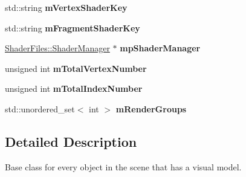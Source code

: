 \begin{DoxyCompactItemize}
\mbox{\label{class_geometry_engine_1_1_geometry_world_item_1_1_geometry_item_1_1_geometry_item_af07660288bf1a19fe7ed2a5ba3677c0b}} 
std\+::string {\bfseries m\+Vertex\+Shader\+Key}
\item 
\mbox{\label{class_geometry_engine_1_1_geometry_world_item_1_1_geometry_item_1_1_geometry_item_ae29f06e4500932eeee49c751abcc21e6}} 
std\+::string {\bfseries m\+Fragment\+Shader\+Key}
\item 
\mbox{\label{class_geometry_engine_1_1_geometry_world_item_1_1_geometry_item_1_1_geometry_item_a3061167ac14626431dc2939e27ca057d}} 
\mbox{\hyperlink{class_shader_files_1_1_shader_manager}{Shader\+Files\+::\+Shader\+Manager}} $\ast$ {\bfseries mp\+Shader\+Manager}
\item 
\mbox{\label{class_geometry_engine_1_1_geometry_world_item_1_1_geometry_item_1_1_geometry_item_ab0d9901b32b79e25d96cc916739af523}} 
unsigned int {\bfseries m\+Total\+Vertex\+Number}
\item 
\mbox{\label{class_geometry_engine_1_1_geometry_world_item_1_1_geometry_item_1_1_geometry_item_a2aaff93904a831edbf34fa8cffe4e248}} 
unsigned int {\bfseries m\+Total\+Index\+Number}
\item 
\mbox{\label{class_geometry_engine_1_1_geometry_world_item_1_1_geometry_item_1_1_geometry_item_ab435d1849fb6bbe6b03a51520e0c2ee6}} 
std\+::unordered\+\_\+set$<$ int $>$ {\bfseries m\+Render\+Groups}
\end{DoxyCompactItemize}


\subsection{Detailed Description}
Base class for every object in the scene that has a visual model. 

